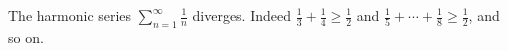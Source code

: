 The harmonic series $\sum_{n=1}^{\infty} \frac{1}{n}$ diverges.
Indeed $\frac{1}{3} + \frac{1}{4} \geq \frac{1}{2}$ and $\frac{1}{5} + \cdots + \frac{1}{8} \geq \frac{1}{2}$, and so on.